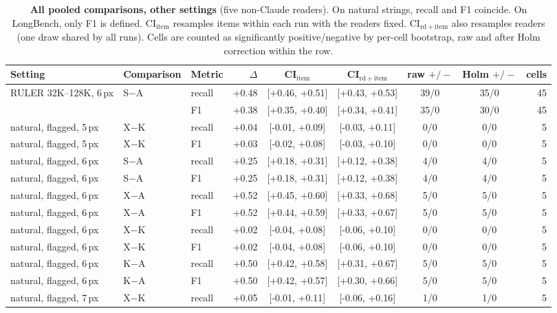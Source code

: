 \begin{table}[!htbp]
\centering
\caption{\textbf{All pooled comparisons, other settings} (five non-Claude readers). On natural strings, recall and F1 coincide. On LongBench, only F1 is defined. CI$_{\mathrm{item}}$ resamples items within each run with the readers fixed. CI$_{\mathrm{rd+item}}$ also resamples readers (one draw shared by all runs). Cells are counted as significantly positive/negative by per-cell bootstrap, raw and after Holm correction within the row.}
\label{tab:app_pooled2}
\footnotesize
\setlength{\tabcolsep}{3pt}
\begin{tabular}{l l l r c c c c r}
\toprule
Setting & Comparison & Metric & $\Delta$ & CI$_{\mathrm{item}}$ & CI$_{\mathrm{rd+item}}$ & raw $+/-$ & Holm $+/-$ & cells \\
\midrule
RULER 32K--128K, 6\,px & S$-$A & recall & +0.48 & [+0.46, +0.51] & [+0.43, +0.53] & 39/0 & 35/0 & 45 \\
 &  & F1 & +0.38 & [+0.35, +0.40] & [+0.34, +0.41] & 35/0 & 30/0 & 45 \\
natural, flagged, 5\,px & X$-$K & recall & +0.04 & [-0.01, +0.09] & [-0.03, +0.11] & 0/0 & 0/0 & 5 \\
natural, flagged, 5\,px & X$-$K & F1 & +0.03 & [-0.02, +0.08] & [-0.03, +0.10] & 0/0 & 0/0 & 5 \\
natural, flagged, 6\,px & S$-$A & recall & +0.25 & [+0.18, +0.31] & [+0.12, +0.38] & 4/0 & 4/0 & 5 \\
natural, flagged, 6\,px & S$-$A & F1 & +0.25 & [+0.18, +0.31] & [+0.12, +0.38] & 4/0 & 4/0 & 5 \\
natural, flagged, 6\,px & X$-$A & recall & +0.52 & [+0.45, +0.60] & [+0.33, +0.68] & 5/0 & 5/0 & 5 \\
natural, flagged, 6\,px & X$-$A & F1 & +0.52 & [+0.44, +0.59] & [+0.33, +0.67] & 5/0 & 5/0 & 5 \\
natural, flagged, 6\,px & X$-$K & recall & +0.02 & [-0.04, +0.08] & [-0.06, +0.10] & 0/0 & 0/0 & 5 \\
natural, flagged, 6\,px & X$-$K & F1 & +0.02 & [-0.04, +0.08] & [-0.06, +0.10] & 0/0 & 0/0 & 5 \\
natural, flagged, 6\,px & K$-$A & recall & +0.50 & [+0.42, +0.58] & [+0.31, +0.67] & 5/0 & 5/0 & 5 \\
natural, flagged, 6\,px & K$-$A & F1 & +0.50 & [+0.42, +0.57] & [+0.30, +0.66] & 5/0 & 5/0 & 5 \\
natural, flagged, 7\,px & X$-$K & recall & +0.05 & [-0.01, +0.11] & [-0.06, +0.16] & 1/0 & 1/0 & 5 \\

\end{tabular}
\end{table}
